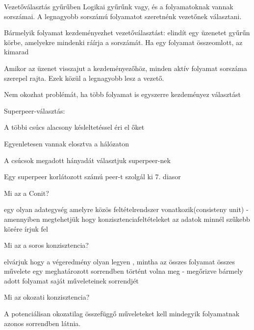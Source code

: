 \documentclass[twoside, a4paper, 12pt]{article}
\begin{document}
\begin{description}
                                    \item  Vezetőválasztás gyűrűben
                                        Logikai gyűrűnk vagy, és a folyamatoknak vannak sorszámai. A legnagyobb sorszámú folyamatot szeretnénk vezetőnek választani.
                                    \item Bármelyik folyamat kezdeményezhet vezetőválasztást: elindít egy üzenetet gyűrűn körbe, amelyekre mindenki ráírja a sorszámát.
                                        Ha egy folyamat összeomlott, az kimarad
                                    \item Amikor az üzenet visszajut a kezdeményezőhöz, minden aktív folyamat sorszáma szerepel rajta. Ezek közül a legnagyobb lesz a vezető.
                                    \item Nem okozhat problémát, ha több folyamat is egyszerre kezdeményez választást	
                                    \item  Superpeer-választás:
                                    \item A többi csúcs alacsony késleltetéssel éri el őket
                                    \item Egyenletesen vannak elosztva a hálózaton
                                    \item A csúcsok megadott hányadát választjuk superpeer-nek
                                    \item Egy superpeer korlátozott számú peer-t szolgál ki
                                        7. diasor
                                    \item  Mi az a Conit?
                                    \item egy olyan adategység amelyre közös feltételrendszer vonatkozik(consisteny unit)
                                        - amennyiben megtehetjük hogy konzisztenciafeltételeket az adatok minnél szűkebb körére írjuk fel
                                    \item  Mi az a soros konzisztencia?
                                    \item elvárjuk hogy a végeredmény olyan legyen , mintha az összes folyamat összes művelete
                                        egy meghatározott sorrendben történt volna meg
                                        - megőrizve bármely adott folyamat saját műveleteinek sorrendjét
                                    \item  Mi az okozati konzisztencia?
                                    \item A potenciálisan okozatilag összefüggő műveleteket kell mindegyik folyamatnak azonos sorrendben látnia.

\end{description}
\end{document}
